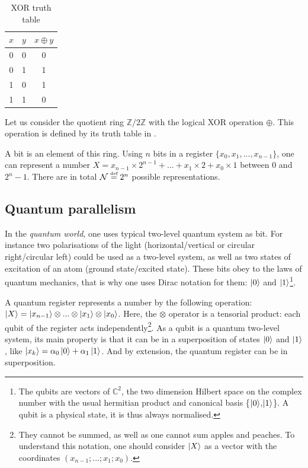\documentclass[twoside, open=right
]{scrreprt}
\newcommand{\defi}{\xspace\ensuremath{\overset{\text{\tiny def}}{=}}\xspace}
\newcommand{\g}{\ensuremath{\ket{0}}\xspace}
\newcommand{\e}{\ensuremath{\ket{1}}\xspace}
\begin{document}
\begin{table}
  \vspace{-10pt}
  \centering
  \begin{tabular}{||c|c||c||}
    \hline
    $x$ & $y$ & $x \oplus y$\\
    \hline \hline
    0 & 0 & 0\\
    0 & 1 & 1\\
    1 & 0 & 1\\
    1 & 1 & 0\\
    \hline
  \end{tabular}
  \caption{\label{XOR-tab} XOR truth table}
  \vspace{-10pt}
\end{table}

\par Let us consider the quotient ring $\mathbb{Z}/2\mathbb{Z}$ with the logical XOR operation $\oplus$. This operation is defined by its truth table in .

\par A bit is an element of this ring. Using $n$ bits in a register $\{ x_0, x_1, ..., x_{n-1} \}$, one can represent a number $X = x_{n-1} \times 2^{n-1} + ... + x_1 \times 2 + x_0 \times 1$ between $0$ and $2^n-1$. There are in total $\mathcal{N} \defi 2^n$ possible representations.

\subsection{Quantum parallelism}
\par In the \emph{quantum world}, one uses typical two-level quantum system as bit. For instance two polarisations of the light (horizontal/vertical or circular right/circular left) could be used as a two-level system, as well as two states of excitation of an atom (ground state/excited state). These bits obey to the laws of quantum mechanics, that is why one uses Dirac notation for them: \g and \e\footnote{The qubits are vectors of $\mathbb{C}^2$, the two dimension Hilbert space on the complex number with the usual hermitian product and canonical basis \{\g,$\ket{1}$\}. A qubit is a physical state, it is thus always normalised.}.

\par A quantum register represents a number by the following operation: $\ket{X} = \ket{x_{n-1}} \otimes ... \otimes \ket{x_1} \otimes \ket{x_0}$. Here, the $\otimes$ operator is a tensorial product: each qubit of the register acts independently\footnote{They cannot be summed, as well as one cannot sum apples and peaches. To understand this notation, one should consider $\ket{X}$ as a vector with the coordinates $(x_{n-1}; ... ; x_1; x_0)$.}. As a qubit is a quantum two-level system, its main property is that it can be in a superposition of states \g and \e, like $\ket{x_k} = \alpha_0 \g + \alpha_1 \e$. And by extension, the quantum register can be in superposition.
\end{document}
